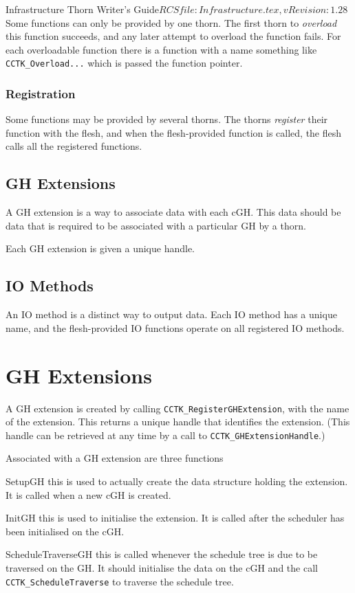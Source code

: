 \begin{cactuspart}{4}{Infrastructure Thorn Writer's Guide}{$RCSfile: Infrastructure.tex,v $}{$Revision: 1.28 $}
Some functions can only be provided by one thorn.  The first thorn to
{\em overload} this function succeeds, and any later attempt to overload
the function fails.  For each overloadable function there is a function
with a name something like {\tt CCTK\_Overload...} which is passed the
function pointer.

\subsection{Registration}

Some functions may be provided by several thorns.  The thorns {\em register}
their function with the flesh, and when the flesh-provided function is called, 
the flesh calls all the registered functions.

\section{GH Extensions}

A GH extension is a way to associate data with each cGH.  This data should be data 
that is required to be associated with a particular GH by a thorn.

Each GH extension is given a unique handle.

\section{IO Methods}

An IO method is a distinct way to output data.  Each IO method has a unique name,
and the flesh-provided IO functions operate on all registered IO methods.

\chapter{GH Extensions}

A GH extension is created by calling {\tt CCTK\_RegisterGHExtension}, with the 
name of the extension.  This returns a unique handle that identifies the extension.
(This handle can be retrieved at any time by a call to {\tt CCTK\_GHExtensionHandle}.)

Associated with a GH extension are three functions

\begin{Lentry}
\item[SetupGH]
this is used to actually create the data structure holding the extension.  It
is called when a new cGH is created.
\item[InitGH]
this is used to initialise the extension.  It is called after the scheduler has
been initialised on the cGH.
\item[ScheduleTraverseGH]
this is called whenever the schedule tree is due to be traversed on the GH.  It
should initialise the data on the cGH and the call {\tt CCTK\_ScheduleTraverse} to traverse 
the schedule tree.
\end{Lentry}


\end{cactuspart}
